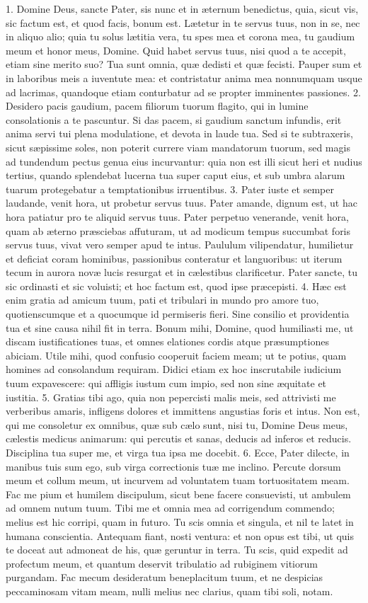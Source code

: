 \documentclass[twoside]{article}
\begin{document}
1. Domine Deus, sancte Pater, sis nunc et in æternum benedictus, quia, sicut vis, sic factum est, et quod facis, bonum est. Lætetur in te servus tuus, non in se, nec in aliquo alio; quia tu solus lætitia vera, tu spes mea et corona mea, tu gaudium meum et honor meus, Domine. Quid habet servus tuus, nisi quod a te accepit, etiam sine merito suo? Tua sunt omnia, quæ dedisti et quæ fecisti. Pauper sum et in laboribus meis a iuventute mea: et contristatur anima mea nonnumquam usque ad lacrimas, quandoque etiam conturbatur ad se propter imminentes passiones.
2. Desidero pacis gaudium, pacem filiorum tuorum flagito, qui in lumine consolationis a te pascuntur. Si das pacem, si gaudium sanctum infundis, erit anima servi tui plena modulatione, et devota in laude tua. Sed si te subtraxeris, sicut sæpissime soles, non poterit currere viam mandatorum tuorum, sed magis ad tundendum pectus genua eius incurvantur: quia non est illi sicut heri et nudius tertius, quando splendebat lucerna tua super caput eius, et sub umbra alarum tuarum protegebatur a temptationibus irruentibus.
3. Pater iuste et semper laudande, venit hora, ut probetur servus tuus. Pater amande, dignum est, ut hac hora patiatur pro te aliquid servus tuus. Pater perpetuo venerande, venit hora, quam ab æterno præsciebas affuturam, ut ad modicum tempus succumbat foris servus tuus, vivat vero semper apud te intus. Paululum vilipendatur, humilietur et deficiat coram hominibus, passionibus conteratur et languoribus: ut iterum tecum in aurora novæ lucis resurgat et in cælestibus clarificetur. Pater sancte, tu sic ordinasti et sic voluisti; et hoc factum est, quod ipse præcepisti.
4. Hæc est enim gratia ad amicum tuum, pati et tribulari in mundo pro amore tuo, quotienscumque et a quocumque id permiseris fieri. Sine consilio et providentia tua et sine causa nihil fit in terra. Bonum mihi, Domine, quod humiliasti me, ut discam iustificationes tuas, et omnes elationes cordis atque præsumptiones abiciam. Utile mihi, quod confusio cooperuit faciem meam; ut te potius, quam homines ad consolandum requiram. Didici etiam ex hoc inscrutabile iudicium tuum expavescere: qui affligis iustum cum impio, sed non sine æquitate et iustitia.
5. Gratias tibi ago, quia non pepercisti malis meis, sed attrivisti me verberibus amaris, infligens dolores et immittens angustias foris et intus. Non est, qui me consoletur ex omnibus, quæ sub cælo sunt, nisi tu, Domine Deus meus, cælestis medicus animarum: qui percutis et sanas, deducis ad inferos et reducis. Disciplina tua super me, et virga tua ipsa me docebit.
6. Ecce, Pater dilecte, in manibus tuis sum ego, sub virga correctionis tuæ me inclino. Percute dorsum meum et collum meum, ut incurvem ad voluntatem tuam tortuositatem meam. Fac me pium et humilem discipulum, sicut bene facere consuevisti, ut ambulem ad omnem nutum tuum. Tibi me et omnia mea ad corrigendum commendo; melius est hic corripi, quam in futuro. Tu scis omnia et singula, et nil te latet in humana conscientia. Antequam fiant, nosti ventura: et non opus est tibi, ut quis te doceat aut admoneat de his, quæ geruntur in terra. Tu scis, quid expedit ad profectum meum, et quantum deservit tribulatio ad rubiginem vitiorum purgandam. Fac mecum desideratum beneplacitum tuum, et ne despicias peccaminosam vitam meam, nulli melius nec clarius, quam tibi soli, notam.
\end{document}

